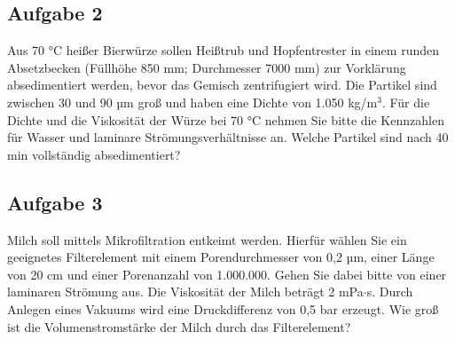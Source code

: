 \documentclass[a4paper,11pt]{article}
\newif\ifshowme
\begin{document}
\subsection*{Aufgabe 2}
Aus 70 °C heißer Bierwürze sollen Heißtrub und Hopfentrester in einem runden Absetzbecken
(Füllhöhe 850 mm; Durchmesser 7000 mm) zur Vorklärung absedimentiert werden, bevor das
Gemisch zentrifugiert wird. Die Partikel sind zwischen 30 und 90 µm groß und haben eine
Dichte von 1.050 kg/m$^3$. Für die Dichte und die Viskosität der Würze bei 70 °C nehmen Sie bitte die Kennzahlen für Wasser und laminare Strömungsverhältnisse an.
\pp
Welche Partikel sind nach 40 min vollständig absedimentiert?


\ifshowme
\antwort{

Geschwindigkeit die Partikel brauchen um nach 40min vollständig absedimentiert zu sein:
\begin{align*}
v &= 0,85~\text{m} / ~2400~\text{s} \\
&= 3,5 \cdot 10^{-4} ~\text{m/s}
\end{align*}
Stokes umstellen:
\begin{align*}
v &= \frac{d^2 \cdot g \cdot (\rho_1 - \rho_2)}{18 \cdot \eta} \\
d &= \sqrt{\frac{v \cdot 18 \cdot \eta}{g \cdot \Delta \rho}} \\
d &= \sqrt{\frac{3,5 \cdot 10^{-4} ~\text{m/s} \cdot 18 \cdot 1 \cdot 10^{-3} ~\text{Pa s}}{9,81 ~\text{m/s} \cdot 50 ~\text{kg/m}^3}} \\
&= 1,13 \cdot 10^{-4} ~\text{m} \\
&= 113 ~\text{µm}
\end{align*}
Alle Partikel die größer als 113 µm sind, sedimentieren vollständig.
}
\else
\pagebreak
\fi



\subsection*{Aufgabe 3}
Milch soll mittels Mikrofiltration entkeimt werden. Hierfür wählen Sie ein geeignetes
Filterelement mit einem Porendurchmesser von 0,2 µm, einer Länge von 20 cm und einer
Porenanzahl von 1.000.000. Gehen Sie dabei bitte von einer laminaren Strömung aus. Die
Viskosität der Milch beträgt 2 mPa$\cdot$s. Durch Anlegen eines Vakuums wird eine Druckdifferenz
von 0,5 bar erzeugt. Wie groß ist die Volumenstromstärke der Milch durch das Filterelement? 
\end{document}
